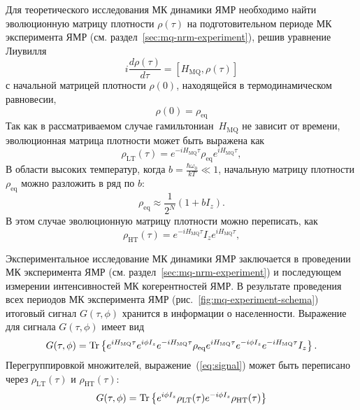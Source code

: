 Для теоретического исследования МК динамики ЯМР
необходимо найти эволюционную матрицу плотности $\rho(\tau)$
на подготовительном периоде МК эксперимента ЯМР (см. раздел~\ref{sec:mq-nrm-experiment}),
решив уравнение Лиувилля~\cite{Feldman2012}
%
\begin{equation}
    \label{eq:liouvile}
    i \dfrac{d\rho(\tau)}{d \tau} =
    \left[H_\mathrm{MQ}, \rho(\tau)\right]
\end{equation}
%
с начальной матрицей плотности $\rho(0)$,
находящейся в термодинамическом равновесии,
%
\begin{equation}
    \label{eq:rho_init}
    \rho(0) = \rho_{\mathrm{eq}}
\end{equation}
%
Так как в рассматриваемом случае гамильтониан~$H_\mathrm{MQ}$
не зависит от времени,
эволюционная матрица плотности может быть выражена как
\begin{equation}
  \label{eq:rho_eval_lt}
  \rho_\mathrm{LT} (\tau) = e^{-iH_\mathrm{MQ}\tau} \rho_\mathrm{eq} e^{iH_\mathrm{MQ}\tau},
\end{equation}
В области высоких температур,
когда $b = \frac{\hbar\omega_{0}}{kT} \ll 1$,
начальную матрицу плотности $\rho_{\mathrm{eq}}$ можно разложить в ряд по $b$:
%
\begin{equation}
  \label{eq:rho_ht}
  \rho_{\mathrm{eq}} \approx \dfrac{1}{2^N} (1 + bI_z).
\end{equation}
%
В этом случае эволюционную матрицу плотности можно переписать, как
\begin{equation}\label{eq:rho_eval_ht}
  \rho_\mathrm{HT} (\tau) =  e^{-iH_\mathrm{MQ}\tau} I_z e^{iH_\mathrm{MQ}\tau},
\end{equation}

Экспериментальное исследование МК динамики ЯМР заключается в проведении
МК эксперимента ЯМР (см. раздел~\ref{sec:mq-nrm-experiment})
и последующем измерении интенсивностей МК когерентностей ЯМР.
В результате проведения всех периодов МК эксперимента ЯМР (рис.~\ref{fig:mq-experiment-schema})
итоговый сигнал $G(\tau, \phi)$ хранится в информации о населенности\cite{Feldman1997}.
Выражение для сигнала $G(\tau, \phi)$ имеет вид
%
\begin{equation}
  \label{eq:signal}
   G(\tau, \phi)
   = \mathrm{Tr} \left\{ 
     e^{iH_\mathrm{MQ}\tau} e^{i\phi I_z} e^{-iH_\mathrm{MQ}\tau}
     \rho_\mathrm{eq}
     e^{iH_\mathrm{MQ}\tau} e^{-i\phi I_z} e^{-iH_\mathrm{MQ}\tau}
     I_z
     \right\}.
\end{equation}
%
Перегруппировкой множителей,
выражение~(\ref{eq:signal}) может быть переписано через
 $\rho_\mathrm{LT} (\tau)$ и $\rho_\mathrm{HT} (\tau)$:
%
\begin{equation}
  \label{eq:signal-short}
  G(\tau, \phi) = \mathrm{Tr} \left\{ 
   e^{i\phi I_z} \rho_\mathrm{LT} (\tau)
   e^{-i\phi I_z} \rho_\mathrm{HT} (\tau)
   \right\}
\end{equation}


